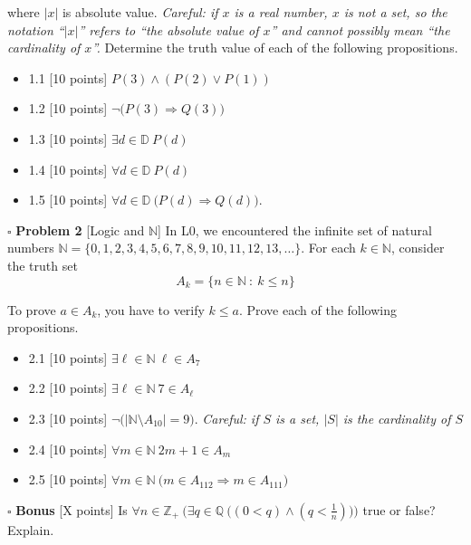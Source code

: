 \documentclass[11pt]{article}
\numberwithin{equation}{section}
\begin{document}
   \noindent where $|x|$ is absolute value.  \textit{Careful: if $x$ is a real number, $x$ is not a set, so the notation ``$|x|$'' refers to ``the absolute value of $x$'' and cannot possibly mean ``the cardinality of $x$''.} Determine the truth value of each of the following propositions.
  \begin{itemize}
  \itemsep0em 
   \item 1.1 [10 points] $P(3) \land (P(2) \lor P(1))$ 
   \item 1.2 [10 points] $\neg \big (P(3) \Rightarrow Q(3) \big )$
   \item 1.3 [10 points] $\exists d \in \mathbb{D} \ P(d)$ 
   \item 1.4 [10 points] $\forall d \in \mathbb{D} \ P(d)$
   \item 1.5 [10 points]  $\forall d \in \mathbb{D} \ \big ( P(d) \Rightarrow Q(d) \big )$.\\
\end{itemize}

 
    \noindent $\square$ \textbf{Problem 2}  [\textsf{Logic and $\mathbb{N}$}] In \textsf{L0}, we encountered the infinite set of natural numbers $\mathbb{N} = \{0,1,2,3,4,5,6,7,8,9,10,11, 12, 13, \ldots\}$.  For each $k \in \mathbb{N}$, consider the truth set $$A_{k} = \{n \in \mathbb{N} \ : \ k \leq n\}$$
    
\noindent To prove $a \in A_k$, you have to verify $k \leq a$.  Prove each of the following propositions.  \begin{itemize}
  \itemsep0em 
  \item 2.1 [10 points] $\exists \ell \in \mathbb{N} \ \ell  \in A_7$
  \item 2.2 [10 points] $\exists \ell \in \mathbb{N} \ 7  \in A_{\ell}$
\item 2.3 [10 points] $\neg \big (| \mathbb{N} \setminus A_{10} | = 9 \big )$. \textit{Careful: if $S$ is a set, $|S|$ is the cardinality of $S$} 
\item 2.4 [10 points] $\forall m \in \mathbb{N} \ 2m+1 \in A_m$
\item 2.5 [10 points] $\forall m \in \mathbb{N} \ \big (m \in A_{112} \Rightarrow m \in A_{111} \big )$\\

 \end{itemize}


    
\noindent $\square$ \textbf{Bonus} [X points] Is $\forall n \in \mathbb{Z}_+ \ \Bigg ( \exists q \in \mathbb{Q} \ \Big( (0< q) \land (q <  \frac{1}{n} ) \Big ) \Bigg )$ true or false? Explain. 
\end{document}
